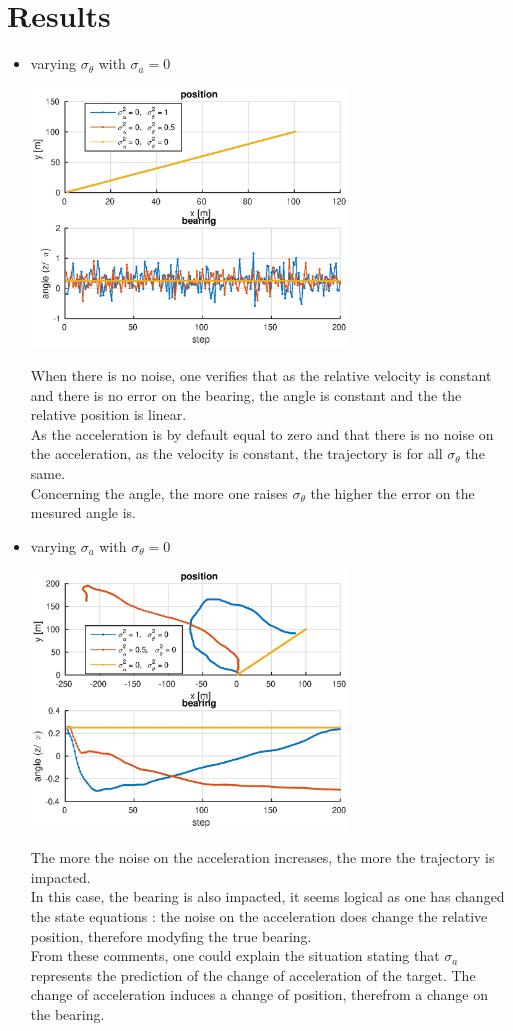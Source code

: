 \documentclass[english,DIV=13]{scrreprt}
\begin{document}
\section*{Results}
\begin{itemize}
\item varying $\sigma_\theta$ with $\sigma_a=0$
\begin{center}	
\includegraphics[width=0.66\textwidth]{img/q2_1.eps}
\end{center}
When there is no noise, one verifies that as the relative velocity is constant and there is no error on
the bearing, the angle is constant and the the relative position is linear.\\
As the acceleration is by default equal to zero and that there is no noise on the acceleration, as the velocity is
constant, the trajectory is for all $\sigma_{\theta}$ the same.\\
Concerning the angle, the more one raises $\sigma_{\theta}$ the higher the error on the mesured angle is.

\item varying $\sigma_a$ with $\sigma_\theta=0$
\begin{center}
\includegraphics[width=0.66\textwidth]{img/q2_2.eps}
\end{center}
The more the noise on the acceleration increases, the more the trajectory is impacted. \\
In this case, the bearing is also impacted, it seems logical as one has changed the state equations :
the noise on the acceleration does change the relative position, therefore modyfing the true bearing. \\
From these comments, one could explain the situation stating that $\sigma_a$ represents the prediction of the 
change of acceleration of the target. The change of acceleration induces a change of position,
therefrom a change on the bearing.



\end{itemize}
\end{document}
